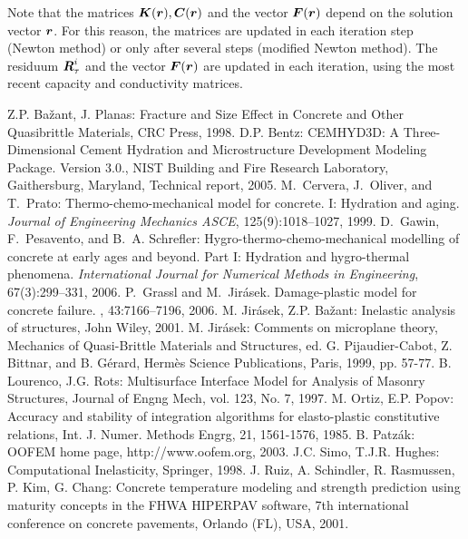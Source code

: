 \documentclass[a4paper]{article}
\newcommand{\mbf}[1]{\mbox{\boldmath$#1$}}
\begin{document}
Note that the matrices $\mbf{K}(\mbf{r}), \mbf{C}(\mbf{r})$ and the vector $\mbf{F}(\mbf{r})$ depend on the solution vector $\mbf{r}$. For this reason, the matrices are updated in each iteration step (Newton method) or only after several steps (modified Newton method). The residuum $\mbf{R}_\tau^{i}$ and the vector $\mbf{F}(\mbf{r})$ are updated in each iteration, using the most recent capacity and conductivity matrices.

\begin{thebibliography}{99}
 Z.P. Ba\v{z}ant, J. Planas: Fracture and Size Effect in Concrete and Other Quasibrittle  Materials, CRC Press, 1998.
 D.P. Bentz: CEMHYD3D: A Three-Dimensional Cement Hydration and Microstructure Development Modeling Package. Version 3.0., NIST Building and Fire Research Laboratory, Gaithersburg, Maryland, Technical report, 2005.
 M.~Cervera, J.~Oliver, and T.~Prato: Thermo-chemo-mechanical model for concrete. I: Hydration and aging. {\em Journal of Engineering Mechanics ASCE}, 125(9):1018--1027, 1999.
 D.~Gawin, F.~Pesavento, and B.~A. Schrefler: Hygro-thermo-chemo-mechanical modelling of concrete at early ages and beyond. Part I: Hydration and hygro-thermal phenomena. {\em International Journal for Numerical Methods in Engineering}, 67(3):299--331, 2006.
 P.~Grassl and M.~Jir\'{a}sek.
\newblock Damage-plastic model for concrete failure.
, 43:7166--7196, 2006.
 M. Jir\'asek, Z.P. Ba\v zant: Inelastic analysis of structures, John Wiley, 2001.
 M. Jir\'{a}sek: Comments on microplane theory, Mechanics of Quasi-Brittle Materials and Structures, ed. G. Pijaudier-Cabot, Z. Bittnar, and B. G\'{e}rard, Herm\`{e}s Science Publications, Paris, 1999, pp. 57-77.
 B. Lourenco, J.G. Rots: Multisurface Interface Model for Analysis of Masonry Structures, Journal of Engng Mech, vol. 123, No. 7, 1997.
 M. Ortiz, E.P. Popov: Accuracy and stability of integration algorithms for elasto-plastic constitutive relations, Int. J. Numer. Methods Engrg, 21, 1561-1576, 1985.
 B. Patz\'ak: OOFEM home page, http://www.oofem.org, 2003.
 J.C. Simo, T.J.R. Hughes: Computational Inelasticity, Springer, 1998.
 J. Ruiz, A. Schindler, R. Rasmussen, P. Kim, G. Chang: Concrete temperature modeling and strength prediction using maturity concepts in the FHWA HIPERPAV software, 7th international conference on concrete pavements, Orlando (FL), USA, 2001.

\end{thebibliography}
\end{document}
